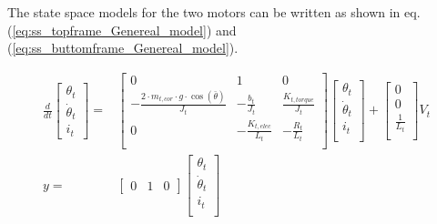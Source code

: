 \documentclass[../../main]{subfiles}
\begin{document}
The state space models for the two motors can be written as shown in eq. (\ref{eq:ss_topframe_Genereal_model}) and (\ref{eq:ss_buttomframe_Genereal_model}).

\begin{equation}
      \label{eq:ss_topframe_Genereal_model}
      \begin{split}
      \frac{d}{dt}
    \begin{bmatrix}
        \theta_t \\
        \dot \theta_t \\
        i_t
    \end{bmatrix}
    =&
    \begin{bmatrix}
        0 & 1               & 0             \\
        -\frac{2\cdot m_{t,cor} \cdot g \cdot \cos(\bar \theta)}{J_t} & -\frac{b_t}{J_t}    & \frac{K_{t,torque}}{J_t} \\
        0 & -\frac{K_{t,elec}}{L_t}  & -\frac{R_t}{L_t}  \\
    \end{bmatrix}
    \begin{bmatrix}
        \theta_t \\
        \dot \theta_t \\
        i_t \\
    \end{bmatrix}
    +
    \begin{bmatrix}
        0 \\
        0 \\
        \frac{1}{L_t} \\
    \end{bmatrix}
    V_t
\\
      y =&
    \begin{bmatrix}
        0 & 1 & 0
    \end{bmatrix}
    \begin{bmatrix}
        \theta_t \\
        \dot \theta_t\\
        i_t\\
    \end{bmatrix}
    \end{split}
\end{equation}
\end{document}
